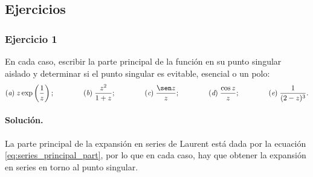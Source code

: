 \documentclass[a4paper]{report}
\begin{document}
\subsection*{Ejercicios}

\subsubsection*{Ejercicio 1}

En cada caso, escribir la parte principal de la función en su punto singular aislado y determinar si el punto singular es evitable, esencial o un polo:
\[
 (\textit{a})\;z\exp\left(\frac{1}{z}\right);\qquad\qquad (\textit{b})\;\frac{z^2}{1+z};\qquad\qquad
 (\textit{c})\;\frac{\sen z}{z};\qquad\qquad (\textit{d})\;\frac{\cos z}{z};\qquad\qquad
 (\textit{e})\;\frac{1}{(2-z)^3}.
\]

\paragraph{Solución.}

La parte principal de la expansión en series de Laurent está dada por la ecuación \ref{eq:series_principal_part}, por lo que en cada caso, hay que obtener la expansión en series en torno al punto singular.
\end{document}
